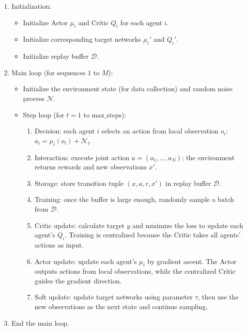 \begin{enumerate}
\def\labelenumi{\arabic{enumi}.}
\tightlist
\item
{}
  Initialization:

  \begin{itemize}
  \tightlist
  \item
    Initialize Actor \(\mu_i\) and Critic \(Q_i\) for each agent \(i\).
  \item
    Initialize corresponding target networks \(\mu_i'\) and \(Q_i'\).
  \item
    Initialize replay buffer \(\mathcal{D}\).
  \end{itemize}
\item
{}
  Main loop (for sequences \(1\) to \(M\)):

  \begin{itemize}
  \tightlist
  \item
    Initialize the environment state (for data collection) and random noise process \(\mathcal{N}\).
  \item
{}
    Step loop (for \(t=1\) to \(\mathrm{max\_steps}\)):

    \begin{enumerate}
    \def\labelenumii{\arabic{enumii}.}
    \tightlist
    \item
      Decision: each agent \(i\) selects an action from local observation \(o_i\): \(a_i=\mu_i(o_i)+\mathcal{N}_t\).
    \item
      Interaction: execute joint action \(a=(a_1,\ldots,a_N)\); the environment returns rewards and new observations \(x'\).
    \item
      Storage: store transition tuple \((x,a,r,x')\) in replay buffer \(\mathcal{D}\).
    \item
      Training: once the buffer is large enough, randomly sample a batch from \(\mathcal{D}\).
    \item
      Critic update: calculate target \(y\) and minimize the loss to update each agent's \(Q_i\). Training is centralized because the Critic takes all agents' actions as input.
    \item
      Actor update: update each agent's \(\mu_i\) by gradient ascent. The Actor outputs actions from local observations, while the centralized Critic guides the gradient direction.
    \item
      Soft update: update target networks using parameter \(\tau\), then use the new observations as the next state and continue sampling.
    \end{enumerate}
  \end{itemize}
\item
  End the main loop.
\end{enumerate}

